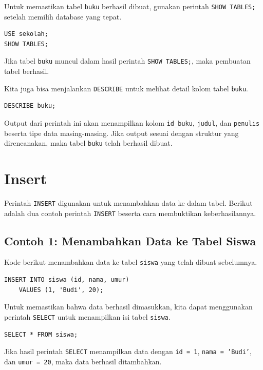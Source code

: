 Untuk memastikan tabel \texttt{buku} berhasil dibuat, gunakan perintah \texttt{SHOW TABLES;} setelah memilih database yang tepat.

\begin{lstlisting}[style=sql]
USE sekolah;
SHOW TABLES;
\end{lstlisting}

Jika tabel \texttt{buku} muncul dalam hasil perintah \texttt{SHOW TABLES;}, maka pembuatan tabel berhasil.

Kita juga bisa menjalankan \texttt{DESCRIBE} untuk melihat detail kolom tabel \texttt{buku}.

\begin{lstlisting}[style=sql]
DESCRIBE buku;
\end{lstlisting}

Output dari perintah ini akan menampilkan kolom \texttt{id\_buku}, \texttt{judul}, dan \texttt{penulis} beserta tipe data masing-masing. Jika output sesuai dengan struktur yang direncanakan, maka tabel \texttt{buku} telah berhasil dibuat.

\section{Insert}

Perintah \texttt{INSERT} digunakan untuk menambahkan data ke dalam tabel. Berikut adalah dua contoh perintah \texttt{INSERT} beserta cara membuktikan keberhasilannya.

\subsection*{Contoh 1: Menambahkan Data ke Tabel Siswa}
Kode berikut menambahkan data ke tabel \texttt{siswa} yang telah dibuat sebelumnya.

\begin{lstlisting}[style=sql]
	INSERT INTO siswa (id, nama, umur)
	VALUES (1, 'Budi', 20);
\end{lstlisting}

Untuk memastikan bahwa data berhasil dimasukkan, kita dapat menggunakan perintah \texttt{SELECT} untuk menampilkan isi tabel \texttt{siswa}.

\begin{lstlisting}[style=sql]
	SELECT * FROM siswa;
\end{lstlisting}

Jika hasil perintah \texttt{SELECT} menampilkan data dengan \texttt{id = 1}, \texttt{nama = 'Budi'}, dan \texttt{umur = 20}, maka data berhasil ditambahkan.

